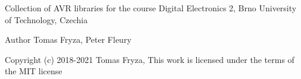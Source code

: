 Collection of A\+VR libraries for the course Digital Electronics 2, Brno University of Technology, Czechia \begin{DoxyAuthor}{Author}
Tomas Fryza, Peter Fleury 
\end{DoxyAuthor}
\begin{DoxyCopyright}{Copyright}
(c) 2018-\/2021 Tomas Fryza, This work is licensed under the terms of the M\+IT license 
\end{DoxyCopyright}
